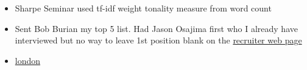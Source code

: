 \documentclass[hyperref]{labbook}
\begin{document}



  \begin{itemize}
  \item Sharpe Seminar used tf-idf weight tonality measure from word count
  \end{itemize}

  \begin{itemize}
  \item Sent Bob Burian my top 5 list.  Had Jason Osajima first who I already  have interviewed  but no way to leave 1st position blank on the  \href{https://fweb.rsma.frb.gov/add/intern_recruiting_2017/cgi-bin/recruiter_view.pl}{recruiter web page }
  \end{itemize}

 \begin{itemize}
 \item \href{https://careers.google.com/jobs#!t=jo&jid=/google/quantitative-analyst-1-13-st-giles-high-st-london-uk-2518841243&}{london}
 \end{itemize}









\end{document}
